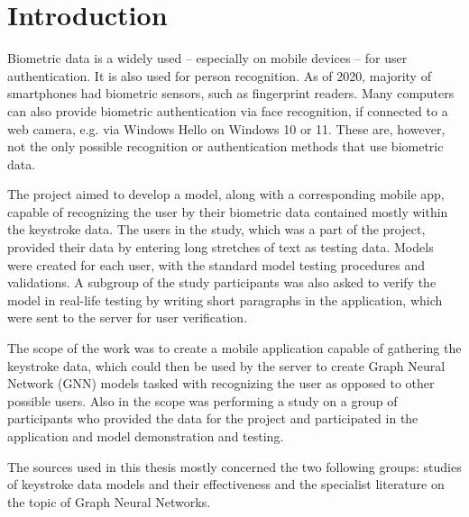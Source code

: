 
\chapter{Introduction}

Biometric data is a widely used -- especially on mobile devices -- for user authentication. It is also used for person recognition. As of 2020, majority of smartphones had biometric sensors, such as fingerprint readers. \cite{statista_biometric_phones_2025} Many computers can also provide biometric authentication via face recognition, if connected to a web camera, e.g. via Windows Hello on Windows 10 or 11. \cite{microsoft_windows_hello_2025} These are, however, not the only possible recognition or authentication methods that use biometric data.

The project aimed to develop a model, along with a corresponding mobile app, capable of recognizing the user by their biometric data contained mostly within the keystroke data. The users in the study, which was a part of the project, provided their data by entering long stretches of text as testing data. Models were created for each user, with the standard model testing procedures and validations. A subgroup of the study participants was also asked to verify the model in real-life testing by writing short paragraphs in the application, which were sent to the server for user verification.

The scope of the work was to create a mobile application capable of gathering the keystroke data, which could then be used by the server to create Graph Neural Network (GNN) models tasked with recognizing the user as opposed to other possible users. Also in the scope was performing a study on a group of participants who provided the data for the project and participated in the application and model demonstration and testing.

The sources used in this thesis mostly concerned the two following groups: studies of keystroke data models and their effectiveness and the specialist literature on the topic of Graph Neural Networks.

